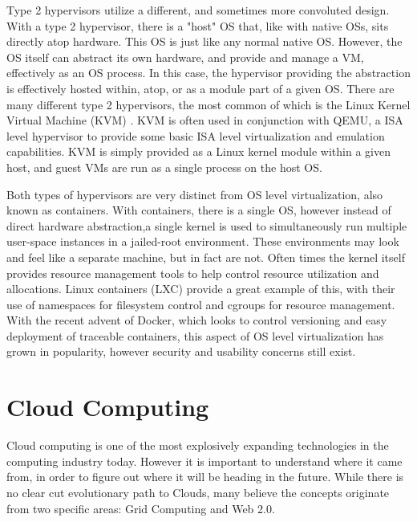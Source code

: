 Type 2 hypervisors utilize a different, and sometimes more convoluted design. With a type 2 hypervisor, there is a "host" OS that, like with native OSs, sits directly atop hardware. This OS is just like any normal native OS. However, the OS itself can abstract its own hardware, and provide and manage a VM, effectively as an OS process.  In this case, the hypervisor providing the abstraction is effectively hosted within, atop, or as a module part of a given OS.  There are many different type 2 hypervisors, the most common of which is the Linux Kernel Virtual Machine (KVM) \cite{kivity2007kvm}. KVM is often used in conjunction with QEMU, a ISA level hypervisor to provide some basic ISA level virtualization and emulation capabilities. KVM is simply provided as a Linux kernel module within a given host, and guest VMs are run as a single process on the host OS. 
 
Both types of hypervisors are very distinct from OS level virtualization, also known as containers. With containers, there is a single OS, however instead of direct hardware abstraction,a single kernel is used to simultaneously run multiple user-space instances in a jailed-root environment. These environments may look and feel like a separate machine, but in fact are not. Often times the kernel itself provides resource management tools to help control resource utilization and allocations. Linux containers (LXC) provide a great example of this, with their use of namespaces for filesystem control and cgroups for resource management. With the recent advent of Docker, which looks to control versioning and easy deployment of traceable containers, this aspect of OS level virtualization has grown in popularity, however security and usability concerns still exist.   


\section{Cloud Computing}
\label{sec:cloudcomputing}

Cloud computing is one of the most explosively expanding technologies in the computing industry today. However it is important to understand where it came from, in order to figure out where it will be heading in the future.  While there is no clear cut evolutionary path to Clouds, many believe the concepts originate from two specific areas: Grid Computing and Web 2.0.

